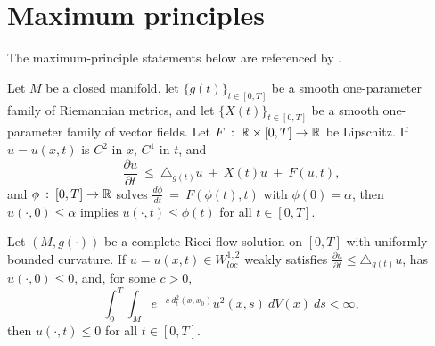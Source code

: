 \section{Maximum principles} \label{maxprin}

The maximum-principle statements below are referenced by \cite{Chow-Lu-Ni}.

\begin{theorem}
  \label{thm:kl-maximum-principles-maximum-principles-theorem}

Let $M$ be a closed manifold, let $\{g(t)\}_{t \in [0,T]}$ be a smooth
one-parameter family of Riemannian metrics, and let $\{X(t)\}_{t \in [0,T]}$
be a smooth one-parameter family of vector fields. Let
$F \: : \: {\mathbb R} \times [0,T] \rightarrow {\mathbb R}$ be Lipschitz. If $u=u(x,t)$ is
$C^2$ in $x$, $C^1$ in $t$, and
\begin{equation}
\frac{\partial u}{\partial t} \: \le \: \triangle_{g(t)}u \: + \: X(t)u \: + \: F(u,t),
\end{equation}
and $\phi \: : \: [0,T] \rightarrow {\mathbb R}$ solves
$\frac{d\phi}{dt} \: = \: F(\phi(t),t)$ with $\phi(0)=\alpha$, then
$u(\cdot,0)\leq\alpha$ implies $u(\cdot,t)\leq\phi(t)$ for all
$t\in[0,T]$.
\end{theorem}

\begin{theorem}
  \label{thm:kl-maximum-principles-estimates-curvature}

Let $(M,g(\cdot))$ be a complete Ricci flow solution on $[0,T]$ with
uniformly bounded curvature. If $u=u(x,t)\in W^{1,2}_{loc}$ weakly satisfies
$\frac{\partial u}{\partial t}\leq\triangle_{g(t)}u$, has
$u(\cdot,0)\leq0$, and, for some $c>0$,
\begin{equation}
\int_0^T\int_M e^{-\:c\:d_t^2(x,x_0)}u^2(x,s)\:dV(x)\:ds<\infty,
\end{equation}
then $u(\cdot,t)\leq0$ for all $t\in[0,T]$.
\end{theorem}

